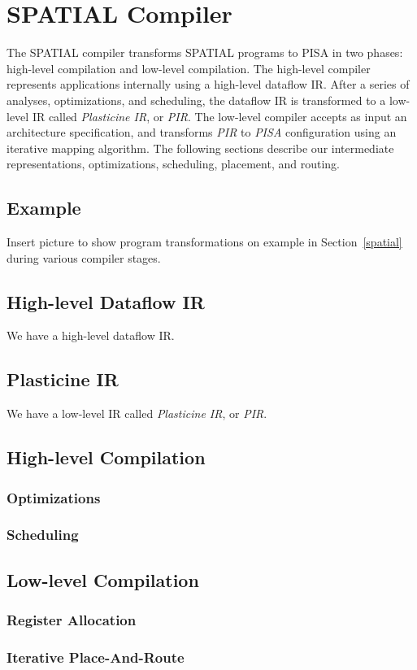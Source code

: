 \section{SPATIAL Compiler}
\label{compiler}
The SPATIAL compiler transforms SPATIAL programs to PISA in two phases: high-level
compilation and low-level compilation. The high-level compiler represents applications
internally using a high-level dataflow IR. After a series of analyses, optimizations, and scheduling, the
dataflow IR is transformed to a low-level IR called \emph{Plasticine IR},
or \emph{PIR}. The low-level compiler accepts as input an architecture specification, and
transforms \emph{PIR} to \emph{PISA} configuration using an iterative mapping algorithm.
The following sections describe our intermediate
representations, optimizations, scheduling, placement, and routing.

\subsection{Example}
Insert picture to show program transformations on example in Section~\ref{spatial} during various
compiler stages.

\subsection{High-level Dataflow IR}
We have a high-level dataflow IR.

\subsection{Plasticine IR}
We have a low-level IR called \emph{Plasticine IR}, or \emph{PIR}.

\subsection{High-level Compilation}
\subsubsection{Optimizations}
\subsubsection{Scheduling}

\subsection{Low-level Compilation}
\subsubsection{Register Allocation}
\subsubsection{Iterative Place-And-Route}
